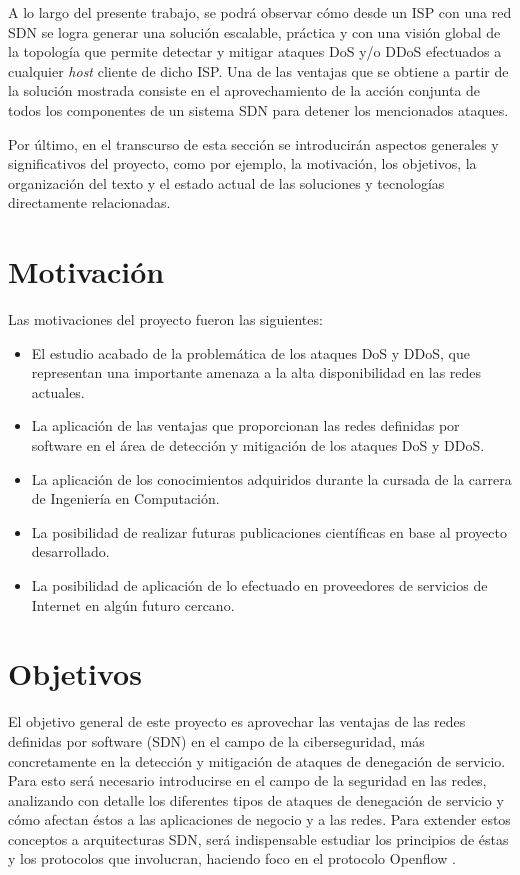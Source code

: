 A lo largo del presente trabajo, se podrá observar cómo desde un ISP con una red SDN se logra generar una solución escalable, práctica y con una visión global de la topología que permite detectar y mitigar ataques DoS y/o DDoS efectuados a cualquier \textit{host} cliente de dicho ISP. Una de las ventajas que se obtiene a partir de la solución mostrada consiste en el aprovechamiento de la acción conjunta de todos los componentes de un sistema SDN para detener los mencionados ataques.

Por último, en el transcurso de esta sección se introducirán aspectos generales y significativos del proyecto, como por ejemplo, la motivación, los objetivos, la organización del texto y el estado actual de las soluciones y tecnologías directamente relacionadas.


\section{Motivación} 

Las motivaciones del proyecto fueron las siguientes:

\begin {itemize}
\item El estudio acabado de la problemática de los ataques DoS y DDoS, que
  representan una importante amenaza a la alta disponibilidad en las redes actuales.
\item La aplicación de las ventajas que proporcionan las redes definidas por software en
  el área de detección y mitigación de los ataques DoS y DDoS.
\item La aplicación de los conocimientos adquiridos durante la cursada de la carrera de
  Ingeniería en Computación.
\item La posibilidad de realizar futuras publicaciones científicas en base al
  proyecto desarrollado.
\item La posibilidad de aplicación de lo efectuado en proveedores de servicios
  de Internet en algún futuro cercano.
\end{itemize}


\section {Objetivos}
El objetivo general de este proyecto es aprovechar las ventajas de las redes
definidas por software (SDN) en el campo de la ciberseguridad, más concretamente
en la detección y mitigación de ataques de denegación de servicio. Para esto
será necesario introducirse en el campo de la seguridad en las redes, analizando
con detalle los diferentes tipos de ataques de denegación de servicio y cómo
afectan éstos a las aplicaciones de negocio y a las redes. Para extender estos
conceptos a arquitecturas SDN, será indispensable estudiar los principios de éstas y los protocolos que involucran, haciendo foco en el protocolo Openflow
\parencite{opf151}.

